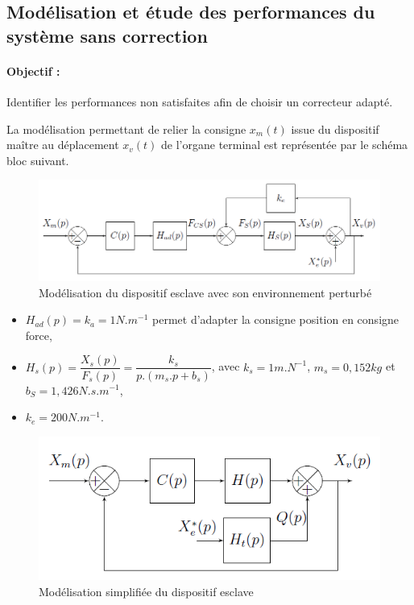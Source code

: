 
\newpage

\subsection{Modélisation et étude des performances du système sans correction}

\paragraph{Objectif :} Identifier les performances non satisfaites afin de choisir un correcteur adapté.

La modélisation permettant de relier la consigne $x_m(t)$ issue du dispositif maître au déplacement $x_v(t)$ de l'organe terminal est représentée par le schéma bloc suivant.

\begin{figure}[ht!]
\begin{center}
 \includegraphics[width=0.9\linewidth]{img/Figure18}
\end{center}
\caption{Modélisation du dispositif esclave avec son environnement perturbé}
\label{fig18}
\end{figure}

\begin{itemize}
 \item $H_{ad}(p)=k_a=1N.m^{-1}$ permet d'adapter la consigne position en consigne force,
 \item $H_s(p)=\dfrac{X_s(p)}{F_s(p)}=\dfrac{k_s}{p.(m_s.p+b_s)}$, avec $k_s=1m.N^{-1}$, $m_s=0,152kg$ et $b_S=1,426N.s.m^{-1}$,
 \item $k_e=200N.m^{-1}$.
\end{itemize}


\begin{figure}[ht!]
\begin{center}
 \includegraphics[width=0.6\linewidth]{img/Figure19}
\end{center}
\caption{Modélisation simplifiée du dispositif esclave}
\label{fig19}
\end{figure}

